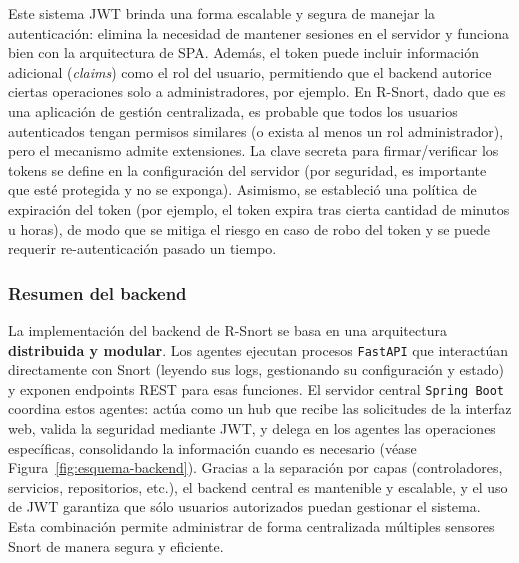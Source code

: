 \documentclass[11pt,a4paper,twoside]{report}
\begin{document}
Este sistema JWT brinda una forma escalable y segura de manejar la autenticación: elimina la necesidad de mantener sesiones en el servidor y funciona bien con la arquitectura de SPA. Además, el token puede incluir información adicional (\textit{claims}) como el rol del usuario, permitiendo que el backend autorice ciertas operaciones solo a administradores, por ejemplo. En R-Snort, dado que es una aplicación de gestión centralizada, es probable que todos los usuarios autenticados tengan permisos similares (o exista al menos un rol administrador), pero el mecanismo admite extensiones. La clave secreta para firmar/verificar los tokens se define en la configuración del servidor (por seguridad, es importante que esté protegida y no se exponga). Asimismo, se estableció una política de expiración del token (por ejemplo, el token expira tras cierta cantidad de minutos u horas), de modo que se mitiga el riesgo en caso de robo del token y se puede requerir re-autenticación pasado un tiempo.

\subsubsection{Resumen del backend}

La implementación del backend de R-Snort se basa en una arquitectura \textbf{distribuida y modular}. Los agentes ejecutan procesos \texttt{FastAPI} que interactúan directamente con Snort (leyendo sus logs, gestionando su configuración y estado) y exponen endpoints REST para esas funciones. El servidor central \texttt{Spring Boot} coordina estos agentes: actúa como un hub que recibe las solicitudes de la interfaz web, valida la seguridad mediante JWT, y delega en los agentes las operaciones específicas, consolidando la información cuando es necesario (véase Figura~\ref{fig:esquema-backend}). Gracias a la separación por capas (controladores, servicios, repositorios, etc.), el backend central es mantenible y escalable, y el uso de JWT garantiza que sólo usuarios autorizados puedan gestionar el sistema. Esta combinación permite administrar de forma centralizada múltiples sensores Snort de manera segura y eficiente.
\end{document}
